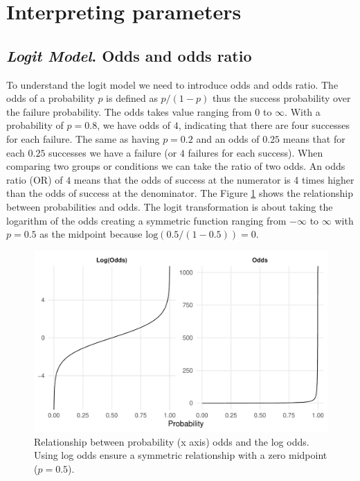 \documentclass[
  man,floatsintext]{apa6}
\begin{document}
\section{Interpreting parameters}\label{interpreting-parameters}

\subsection{\texorpdfstring{\emph{Logit Model}. Odds and odds ratio}{Logit Model. Odds and odds ratio}}\label{logit-model.-odds-and-odds-ratio}

To understand the logit model we need to introduce odds and odds ratio. The odds of a probability \(p\) is defined as \(p/(1 - p)\) thus the success probability over the failure probability. The odds takes value ranging from \(0\) to \(\infty\). With a probability of \(p = 0.8\), we have odds of \(4\), indicating that there are four successes for each failure. The same as having \(p = 0.2\) and an odds of \(0.25\) means that for each \(0.25\) successes we have a failure (or \(4\) failures for each success). When comparing two groups or conditions we can take the ratio of two odds. An odds ratio (OR) of \(4\) means that the odds of success at the numerator is 4 times higher than the odds of success at the denominator. The Figure \ref{fig:fig-odds-example} shows the relationship between probabilities and odds. The logit transformation is about taking the logarithm of the odds creating a symmetric function ranging from \(-\infty\) to \(\infty\) with \(p = 0.5\) as the midpoint because \(\text{log}(0.5/(1 - 0.5)) = 0\).

\scriptsize

\begin{figure}

{\centering \includegraphics[width=1\linewidth]{paper_files/figure-latex/fig-odds-example-1} 

}

\caption{Relationship between probability (x axis) odds and the log odds. Using log odds ensure a symmetric relationship with a zero midpoint (\(p = 0.5\)).}\label{fig:fig-odds-example}
\end{figure}
\end{document}
